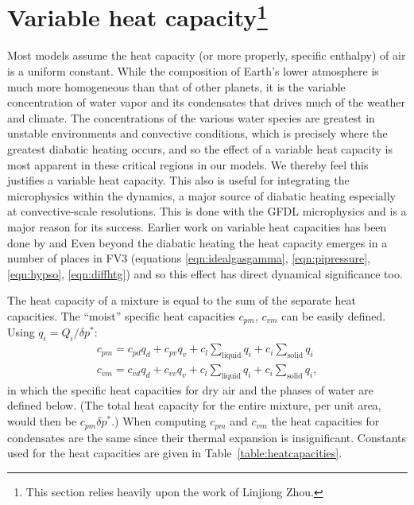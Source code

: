 \documentclass[10pt,letterpaper,margin=1in]{memoir}
\begin{document}
\section{Variable heat capacity\footnote{This section relies heavily upon the work of Linjiong Zhou.}} \label{sec:moistkappa}

Most models assume the heat capacity (or more properly, specific enthalpy) of air is a uniform constant. While the composition of Earth's lower atmosphere is much more homogeneous than that of other planets, it is the variable concentration of water vapor and its condensates that drives much of the weather and climate. The concentrations of the various water species are greatest in unstable environments and convective conditions, which is precisely where the greatest diabatic heating occurs, and so the effect of a variable heat capacity is most apparent in these critical regions in our models. We thereby feel this justifies a variable heat capacity. This also is useful for integrating the microphysics within the dynamics, a major source of diabatic heating especially at convective-scale resolutions. This is done with the GFDL microphysics \citep{ChenLin2013,Zhou2019,Harris2020} and is a major reason for its success. Earlier work on variable heat capacities has been done by \citet{Ooyama1990} and \citet{Satoh2008} Even beyond the diabatic heating the heat capacity emerges in a number of places in FV3 (equations \eqref{eqn:idealgasgamma}, \eqref{eqn:pipressure}, \eqref{eqn:hypso}, \eqref{eqn:diffhtg}) and so this effect has direct dynamical significance too.


The heat capacity of a mixture is equal to the sum of the separate heat capacities. The ``moist'' specific heat capacities $c_{pm}$, $c_{vm}$ can be easily defined. Using $q_i = Q_i/\delta p^*$:
\begin{equation}
\begin{split}
c_{pm} = c_{pd}q_d + c_{pv}q_v + c_{l}\sum_\text{liquid}q_i + c_{i}\sum_\text{solid}q_i \\
c_{vm} = c_{vd}q_d + c_{vv}q_v + c_{l}\sum_\text{liquid}q_i + c_{i}\sum_\text{solid}q_i,
\end{split}
\end{equation}
in which the specific heat capacities for dry air and the phases of water are defined below.  (The total heat capacity for the entire mixture, per unit area, would then be $c_{pm}\delta p^*$.) When computing $c_{pm}$ and $c_{vm}$ the heat capacities for condensates are the same since their thermal expansion is insignificant. Constants used for the heat capacities are given in Table~\ref{table:heatcapacities}.
\end{document}
